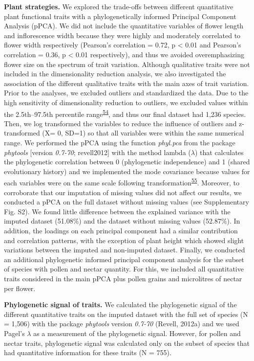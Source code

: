\documentclass[12pt,a4paper,]{article}
\begin{document}
\textbf{Plant strategies.} We explored the trade-offs between different
quantitative plant functional traits with a phylogenetically informed
Principal Component Analysis (pPCA). We did not include the quantitative
variables of flower length and inflorescence width because they were
highly and moderately correlated to flower width respectively (Pearson's
correlation = 0.72, p \textless{} 0.01 and Pearson's correlation = 0.36,
p \textless{} 0.01 respectively), and thus we avoided overemphasizing
flower size on the spectrum of trait variation. Although qualitative
traits were not included in the dimensionality reduction analysis, we
also investigated the association of the different qualitative traits
with the main axes of trait variation. Prior to the analyses, we
excluded outliers and standardized the data. Due to the high sensitivity
of dimensionality reduction to outliers, we excluded values within the
2.5th--97.5th percentile
range\textsuperscript{\protect\hyperlink{ref-legendre2012}{54}}, and
thus our final dataset had 1,236 species. Then, we log transformed the
variables to reduce the influence of outliers and z-transformed (X= 0,
SD=1) so that all variables were within the same numerical range. We
performed the pPCA using the function \emph{phyl.pca} from the package
\emph{phytools} {[}version \emph{0.7-70}; revell2012{]} with the method
lambda (\(\lambda\)) that calculates the phylogenetic correlation
between 0 (phylogenetic independence) and 1 (shared evolutionary
history) and we implemented the mode covariance because values for each
variables were on the same scale following
transformation\textsuperscript{\protect\hyperlink{ref-abdi2010}{55}}.
Moreover, to corroborate that our imputation of missing values did not
affect our results, we conducted a pPCA on the full dataset without
missing values (see Supplementary Fig. S2). We found little difference
between the explained variance with the imputed dataset (51.08\%) and
the dataset without missing values (52.87\%). In addition, the loadings
on each principal component had a similar contribution and correlation
patterns, with the exception of plant height which showed slight
variations between the imputed and non-imputed dataset. Finally, we
conducted an additional phylogenetic informed principal component
analysis for the subset of species with pollen and nectar quantity. For
this, we included all quantitative traits considered in the main pPCA
plus pollen grains and microlitres of nectar per flower.

\textbf{Phylogenetic signal of traits.} We calculated the phylogenetic
signal of the different quantitative traits on the imputed dataset with
the full set of species (N = 1,506) with the package \emph{phytools}
version \emph{0.7-70} (Revell, 2012a) and we used Pagel's \(\lambda\) as
a measurement of the phylogenetic signal. However, for pollen and nectar
traits, phylogenetic signal was calculated only on the subset of species
that had quantitative information for these traits (N = 755).
\end{document}

